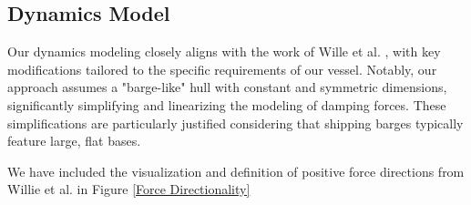 \documentclass[conference]{IEEEtran}
\begin{document}
\subsection{Dynamics Model}
\label{section:dynamics_model}

Our dynamics modeling closely aligns with the work of Wille et al. \cite{ModelingCourseControl}, with key modifications tailored to the specific requirements of our vessel. Notably, our approach assumes a "barge-like" hull with constant and symmetric dimensions, significantly simplifying and linearizing the modeling of damping forces. These simplifications are particularly justified considering that shipping barges typically feature large, flat bases.

We have included the visualization and definition of positive force directions from Willie et al. \cite{ModelingCourseControl} in Figure \ref{Force Directionality}
\end{document}

